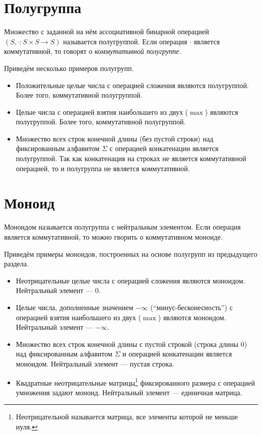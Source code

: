 \section{Полугруппа}


\begin{definition}[Полугруппа]
Множество с заданной на нём ассоциативной бинарной операцией $(S,\cdot : S \times S \to S )$ называется полугруппой.
Если операция $\cdot$ является коммутативной, то говорят о \textit{коммутативной полугруппе}.
\end{definition}


\begin{example} Приведём несколько примеров полугрупп.
\begin{itemize}
	\item Положительные целые числа с операцией сложения являются полугруппой. Более того, коммутативной полугруппой.
	\item Целые числа с операцией взятия наибольшего из двух ($\max$) являются полугруппой. Более того, коммутативной полугруппой.
	\item Множество всех строк конечной длины (без пустой строки) над фиксированным алфавитом $\Sigma$ с операцией конкатенации является полугруппой. Так как конкатенация на строках не является коммутативной операцией, то и полугруппа не является коммутативной.	
\end{itemize}
\end{example}


\section{Моноид}


\begin{definition}[Моноид]
Моноидом называется полугруппа с нейтральным элементом. Если операция является коммутативной, то можно гворить о коммутативном моноиде.
\end{definition}

\begin{example} Приведём примеры моноидов, построенных на основе полугрупп из предыдущего раздела.

\begin{itemize}
	\item Неотрицательные целые числа с операцией сложения являются моноидом. Нейтральный элемент --- $0$.
	\item Целые числа, дополненные значением $-\infty$ (``минус-бесконесность'') с операцией взятия наибольшего из двух ($\max$) являются моноидом. Нейтральный элемент --- $-\infty$.
	\item Множество всех строк конечной длины с пустой строкой (строка длины 0) над фиксированным алфавитом $\Sigma$ и операцией конкатенации является моноидом. Нейтральный элемент --- пустая строка.
	\item Квадратные неотрицательные матрицы\footnote{Неотрицательной называется матрица, все элементы которой не меньше нуля.} фиксированного размера с операцией умножения задают моноид. Нейтральный элемент --- единичная матрица.
\end{itemize}
\end{example}


